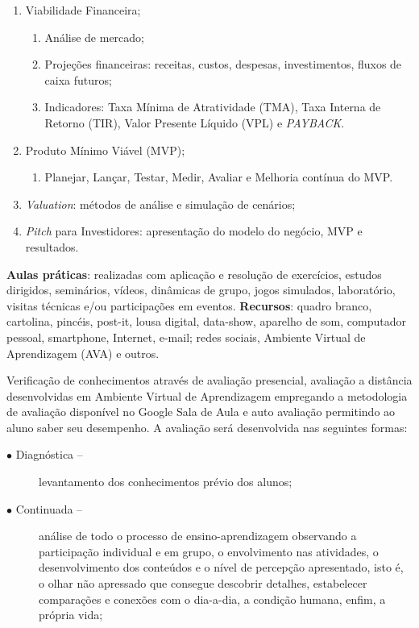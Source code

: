 \begin{pud}
\begin{description}[itemsep=0em, topsep=0em]
\begin{enumerate}[itemsep=0em, topsep=0em]
			\item Viabilidade Financeira;
			\begin{enumerate}[itemsep=0em, topsep=0em, label*=\arabic*.]
				\item Análise de mercado;
				\item Projeções financeiras: receitas, custos, despesas, investimentos, fluxos de caixa futuros;
				\item Indicadores: Taxa Mínima de Atratividade (TMA), Taxa Interna de Retorno (TIR), Valor Presente Líquido (VPL) e \textit{PAYBACK}. 
			\end{enumerate}
			
			\item Produto Mínimo Viável (MVP);
			\begin{enumerate}[itemsep=0em, topsep=0em, label*=\arabic*.]
			  \item Planejar, Lançar, Testar, Medir, Avaliar e Melhoria cont\'inua do MVP. 
			\end{enumerate}
			
			\item \textit{Valuation}: métodos de análise e simulação de cenários;
			\item \textit{Pitch} para Investidores: apresentação do modelo do negócio, MVP e resultados.
		\end{enumerate}
		
	\end{description}
	   
	
	\metodologia
	\textbf{Aulas práticas}: realizadas com aplicação e resolução de exercícios, estudos dirigidos, seminários, vídeos, dinâmicas de grupo, jogos simulados, laboratório, visitas técnicas e/ou participações em eventos.
	\textbf{Recursos}: quadro branco, cartolina, pincéis, post-it, lousa digital, data-show, aparelho de som, computador pessoal, smartphone, Internet, e-mail; redes sociais, Ambiente Virtual de Aprendizagem (AVA) e outros.
	
	\avaliacao
	Verificação de conhecimentos através de avaliação presencial, avaliação a distância desenvolvidas em Ambiente Virtual de Aprendizagem empregando a metodologia de avaliação disponível no Google Sala de Aula e auto avaliação permitindo ao aluno saber seu desempenho. A avaliação será desenvolvida nas seguintes formas:
	\begin{description}
		\item[$\bullet$ Diagnóstica --] levantamento dos conhecimentos prévio dos alunos;
        \item[$\bullet$ Continuada --] análise de todo o processo de ensino-aprendizagem observando a participação individual e em grupo, o envolvimento nas atividades, o desenvolvimento dos conteúdos e o nível de percepção apresentado, isto é, o olhar não apressado que consegue descobrir detalhes, estabelecer comparações e conexões com o dia-a-dia, a condição humana, enfim, a própria vida;
	\end{description}
        

\end{pud}
